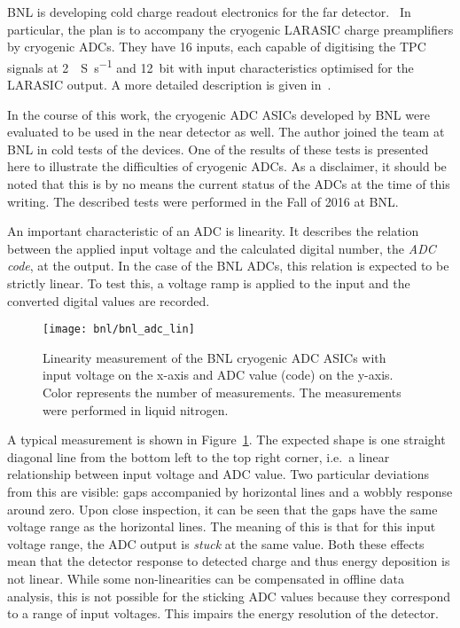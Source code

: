 BNL is developing cold charge readout electronics for the \dune{} far detector.~\cite{protodune-sp}
In particular, the plan is to accompany the cryogenic LARASIC charge preamplifiers by cryogenic ADCs.
They have \num{16} inputs, each capable of digitising the TPC signals at \SI{2}{\mega{}S\per\second} and \SI{12}{bit} with input characteristics optimised for the LARASIC output.
A more detailed description is given in~\cite{bnl_adc}.

In the course of this work, the cryogenic ADC ASICs developed by BNL were evaluated to be used in the near detector as well.
The author joined the team at BNL in cold tests of the devices.
One of the results of these tests is presented here to illustrate the difficulties of cryogenic ADCs.
As a disclaimer, it should be noted that this is by no means the current status of the ADCs at the time of this writing.
The described tests were performed in the Fall of 2016 at BNL.

An important characteristic of an ADC is linearity.
It describes the relation between the applied input voltage and the calculated digital number, the \emph{ADC code}, at the output.
In the case of the BNL ADCs, this relation is expected to be strictly linear.
To test this, a voltage ramp is applied to the input and the converted digital values are recorded.

\begin{figure}[htb]
	\centering
	\texttt{[image: bnl/bnl\_adc\_lin]}
	\caption{Linearity measurement of the BNL cryogenic ADC ASICs with input voltage on the x-axis and ADC value (code) on the y-axis.
	Color represents the number of measurements.
	The measurements were performed in liquid nitrogen.}
	\label{fig:bnl_adc_lin}
\end{figure}

A typical measurement is shown in Figure~\ref{fig:bnl_adc_lin}.
The expected shape is one straight diagonal line from the bottom left to the top right corner, i.e.\ a linear relationship between input voltage and ADC value.
Two particular deviations from this are visible: gaps accompanied by horizontal lines and a wobbly response around zero.
Upon close inspection, it can be seen that the gaps have the same voltage range as the horizontal lines.
The meaning of this is that for this input voltage range, the ADC output is \emph{stuck} at the same value.
Both these effects mean that the detector response to detected charge and thus energy deposition is not linear.
While some non-linearities can be compensated in offline data analysis, this is not possible for the sticking ADC values because they correspond to a range of input voltages.
This impairs the energy resolution of the detector.

